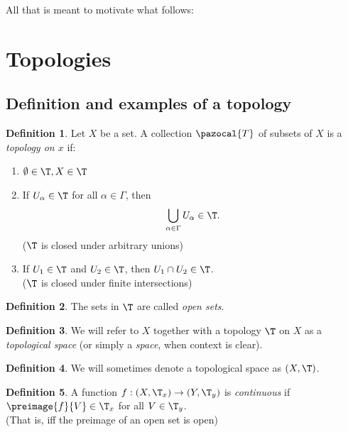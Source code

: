 \documentclass[a5paper]{article}
\theoremstyle{definition}%
\newtheorem*{definition*}{Definition}
\numberwithin{exercise}{section}
\theoremstyle{remark}%
\begin{document}
All that is meant to motivate what follows:

\section{Topologies}

\subsection{Definition and examples of a topology}

\begin{highlight}
\begin{definition*}
Let $X$ be a set. A collection $\pazocal{T}$ of subsets of $X$ is a \emph{topology on $x$} if:
\begin{enumerate}
\item $\emptyset \in \T, X \in \T$
\item If $U_\alpha \in \T$ for all $\alpha \in \Gamma$, then 
$$\bigcup_{\alpha \in \Gamma}U_\alpha \in \T.$$
($\T$ is closed under arbitrary unions)
\item If $U_1 \in \T$ and $U_2 \in \T$, then $U_1\cap U_2 \in \T$. \\
($\T$ is closed under finite intersections)
\end{enumerate}
\end{definition*}
\end{highlight}

\begin{definition*}
The sets in $\T$ are called \emph{open sets}. 
\end{definition*}

\begin{definition*}
We will refer to $X$ together with a topology $\T$ on $X$ as a \emph{topological space} (or simply a \emph{space}, when context is clear).
\end{definition*}

\begin{definition*}
We will sometimes denote a topological space as $(X, \T)$.
\end{definition*}

\begin{highlight}
\begin{definition*}
A function $f:(X, \T_x) \to (Y, \T_y)$ is \emph{continuous} if $\preimage{f}{V}\in\T_x$ for all $V \in \T_y$.\\
(That is, iff the preimage of an open set is open)
\end{definition*}
\end{highlight}
\end{document}
